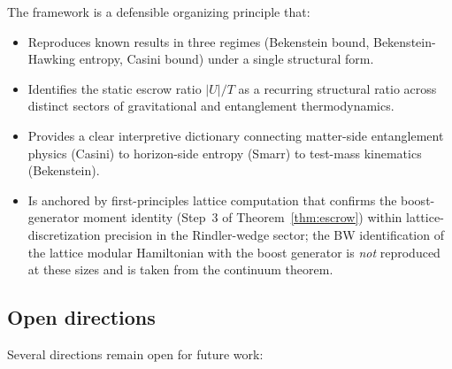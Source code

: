 \documentclass[11pt]{article}
\begin{document}
The framework is a defensible organizing principle that:

\begin{itemize}
\item Reproduces known results in three regimes (Bekenstein bound, Bekenstein-Hawking entropy, Casini bound) under a single structural form.
\item Identifies the static escrow ratio $|U|/T$ as a recurring structural ratio across distinct sectors of gravitational and entanglement thermodynamics.
\item Provides a clear interpretive dictionary connecting matter-side entanglement physics (Casini) to horizon-side entropy (Smarr) to test-mass kinematics (Bekenstein).
\item Is anchored by first-principles lattice computation that confirms the boost-generator moment identity (Step~3 of Theorem~\ref{thm:escrow}) within lattice-discretization precision in the Rindler-wedge sector; the BW identification of the lattice modular Hamiltonian with the boost generator is \emph{not} reproduced at these sizes and is taken from the continuum theorem.
\end{itemize}

\subsection{Open directions}

Several directions remain open for future work:
\end{document}
